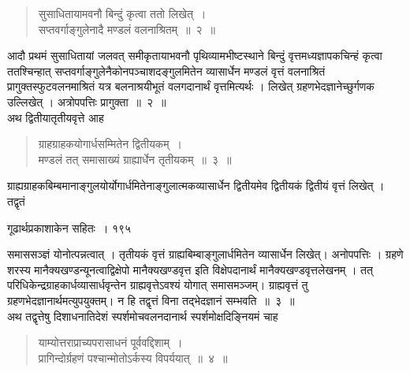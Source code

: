 \documentclass[11pt, openany]{book}
\begin{document}
\begin{quote}
  {\ssi सुसाधितायामवनौ बिन्दुं कृत्वा ततो लिखेत्~।\\
सप्तवर्गाङ्गुलेनादै मण्डलं वलनाश्रितम्~॥~२~॥}
\end{quote}

\begin{sloppypar}
आदौ प्रथमं सुसाधितायां जलवत् समीकृतायाभवनौ पृथिव्यामभीष्टस्थाने बिन्दुं वृत्तमध्यज्ञापकचिन्हं कृत्वा ततश्चिन्हात् सप्तवर्गाङ्गुलेनैकोनपञ्चाशदङ्गुलमितेन व्यासार्धेन मण्डलं वृत्तं वलनाश्रितं प्रागुक्तस्फुटवलनमाश्रितं यत्र बलनाश्रयीभूतं वलगदानार्थं वृत्तमित्यर्थः । लिखेत् ग्रहणभेदज्ञानेच्छुर्गणक उल्लिखेत् । अत्रोपपत्तिः प्रागुक्ता~॥~२~॥\\
\noindent अथ द्वितीयातृतीयवृत्ते आह\textendash
\end{sloppypar}


\begin{quote}
{\ssi ग्राहग्राहकयोगार्धसम्मितेन द्वितीयकम्~।\\
मण्डलं तत् समासाख्यं ग्राह्यार्धेन तृतीयकम्~॥~३~॥}
\end{quote}



 ग्राह्यग्राहकबिम्बमानाङ्गुलयोर्योगार्धमितेनाङ्गुलात्मकव्यासार्धेन द्वितीयमेव द्वितीयकं द्वितीयं वृत्तं लिखेत् । तद्वृतं

\newpage


 \hspace{3cm} गूढार्थप्रकाशाकेन सहितः~। \hfill १९५
\vspace{1cm}
 
\begin{sloppypar}
\noindent समाससञ्ज्ञं योनोत्पन्नत्वात् । तृतीयकं वृत्तं ग्राह्यबिम्बाङ्गुलार्धमितेन व्यासार्धेन लिखेत्। अनोपपत्तिः । ग्रहणे शरस्य मानैक्यखण्डन्यूनत्वाद्विक्षेपो मानैक्यखण्डवृत्त इति विक्षेपदानार्थं मानैक्यखण्डवृत्तलेखनम् । तत् परिधिकेन्द्रग्राहकार्धव्यासार्धवृन्तेन ग्राह्यवृत्तेऽवश्यं योगात् समासमञ्जम्। ग्राह्यवृत्तं तु ग्रहणभेदज्ञानार्थमत्युपयुक्तम्। न हि तद्वृत्तं विना तद्भेदज्ञानं सम्भवति~॥~३~॥\\
\noindent अथ तद्वृत्तेषु दिशाधनातिदेशं स्पर्शमोचवलनदानार्थ स्पर्शमोक्षदिङ्नियमं चाह\textendash
\end{sloppypar}


\begin{quote}
  {\ssi याम्योत्तराप्राच्यपरासाधनं पूर्ववद्दिशाम्~।\\
 प्रागिन्दोर्ग्रहणं पश्चान्मोतोऽर्कस्य विपर्ययात्~॥~४~॥}
 \end{quote}
\end{document}
